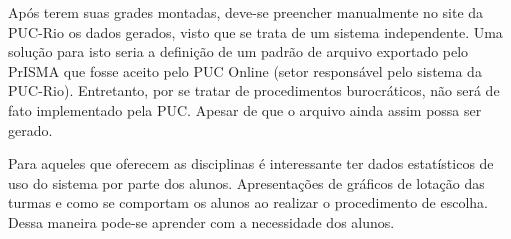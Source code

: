 Após terem suas grades montadas, deve-se preencher manualmente no site da PUC-Rio os dados gerados, visto que se trata de um sistema independente. Uma solução para isto seria a definição de um padrão de arquivo exportado pelo PrISMA que fosse aceito pelo PUC Online (setor responsável pelo sistema da PUC-Rio). Entretanto, por se tratar de procedimentos burocráticos, não será de fato implementado pela PUC. Apesar de que o arquivo ainda assim possa ser gerado.

Para aqueles que oferecem as disciplinas é interessante ter dados estatísticos de uso do sistema por parte dos alunos. Apresentações de gráficos de lotação das turmas e como se comportam os alunos ao realizar o procedimento de escolha. Dessa maneira pode-se aprender com a necessidade dos alunos.
